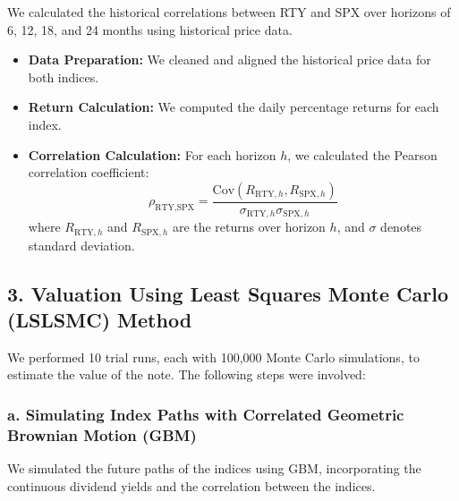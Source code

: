 \documentclass[12pt,a4paper]{article}
\begin{document}
We calculated the historical correlations between RTY and SPX over horizons of 6, 12, 18, and 24 months using historical price data.

\begin{itemize}
    \item \textbf{Data Preparation:} We cleaned and aligned the historical price data for both indices.
    \item \textbf{Return Calculation:} We computed the daily percentage returns for each index.
    \item \textbf{Correlation Calculation:} For each horizon \( h \), we calculated the Pearson correlation coefficient:
    \[
    \rho_{\text{RTY}, \text{SPX}} = \frac{\text{Cov}(R_{\text{RTY},h}, R_{\text{SPX},h})}{\sigma_{\text{RTY},h} \sigma_{\text{SPX},h}}
    \]
    where \( R_{\text{RTY},h} \) and \( R_{\text{SPX},h} \) are the returns over horizon \( h \), and \( \sigma \) denotes standard deviation.
\end{itemize}

\subsection*{3. Valuation Using Least Squares Monte Carlo (LSLSMC) Method}

We performed 10 trial runs, each with 100,000 Monte Carlo simulations, to estimate the value of the note. The following steps were involved:

\subsubsection*{a. Simulating Index Paths with Correlated Geometric Brownian Motion (GBM)}

We simulated the future paths of the indices using GBM, incorporating the continuous dividend yields and the correlation between the indices.
\end{document}

